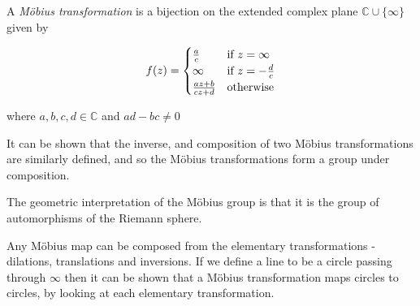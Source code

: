 \documentclass{article}
\begin{document}
A \emph{M\"obius transformation} is a bijection on the extended complex plane $\mathbb{C} \cup \{\infty\}$ given by

$$f(z) =
\begin{cases}
\frac{a}{c} &\text{if } z = \infty \\
\infty &\text{if } z = -{d \over c}\\
\frac{az+b}{cz+d} &\text{otherwise}
\end{cases}
$$

where $a,b,c,d \in \mathbb{C}$ and $ad - bc \ne 0$

It can be shown that the inverse, and composition of two M\"obius transformations are similarly defined, and so the M\"obius transformations form a group under composition.

The geometric interpretation of the M\"obius group is that it is the group of automorphisms of the Riemann sphere.

Any M\"obius map can be composed from the elementary transformations - dilations, translations and inversions. If we define a line to be a circle passing through $\infty$ then it can be shown that a M\"obius transformation maps circles to circles, by looking at each elementary transformation.
\end{document}
